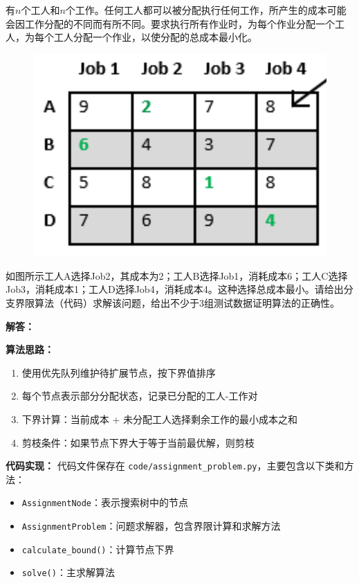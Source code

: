 \documentclass[12pt,twoside]{article}
\begin{document}
\begin{problems}
有$n$个工人和$n$个工作。任何工人都可以被分配执行任何工作，所产生的成本可能会因工作分配的不同而有所不同。要求执行所有作业时，为每个作业分配一个工人，为每个工人分配一个作业，以使分配的总成本最小化。
\begin{figure}[h]
    \centering
    \includegraphics[scale=0.55]{fig/jobassign.png}
 \end{figure}

 如图所示工人A选择Job2，其成本为2；工人B选择Job1，消耗成本6；工人C选择Job3，消耗成本1；工人D选择Job4，消耗成本4。这种选择总成本最小。请给出分支界限算法（代码）求解该问题，给出不少于3组测试数据证明算法的正确性。

{\bf 解答：}

{\bf 算法思路：}
\begin{enumerate}
    \item 使用优先队列维护待扩展节点，按下界值排序
    \item 每个节点表示部分分配状态，记录已分配的工人-工作对
    \item 下界计算：当前成本 + 未分配工人选择剩余工作的最小成本之和
    \item 剪枝条件：如果节点下界大于等于当前最优解，则剪枝
\end{enumerate}

{\bf 代码实现：}
代码文件保存在 \texttt{code/assignment\_problem.py}，主要包含以下类和方法：
\begin{itemize}
    \item \texttt{AssignmentNode}：表示搜索树中的节点
    \item \texttt{AssignmentProblem}：问题求解器，包含界限计算和求解方法
    \item \texttt{calculate\_bound()}：计算节点下界
    \item \texttt{solve()}：主求解算法
\end{itemize}


\end{problems}
\end{document}
